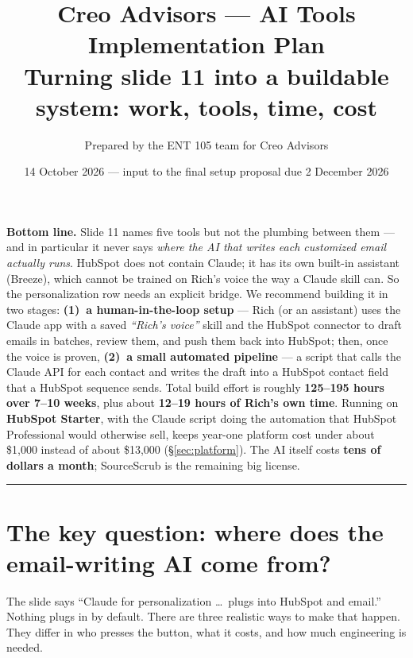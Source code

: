 \documentclass[11pt]{article}
\title{\textbf{\color{creonavy} Creo Advisors --- AI Tools Implementation Plan}\\[3pt]
\large Turning slide 11 into a buildable system: work, tools, time, cost}
\author{\normalsize Prepared by the ENT 105 team for Creo Advisors}
\date{\normalsize 14 October 2026 --- input to the final setup proposal due 2 December 2026}
\begin{document}
\maketitle
\vspace{-1.2em}

\begin{bigidea}
\textbf{Bottom line.} Slide 11 names five tools but not the plumbing between them --- and in
particular it never says \emph{where the AI that writes each customized email actually runs}.
HubSpot does not contain Claude; it has its own built-in assistant (Breeze), which cannot be
trained on Rich's voice the way a Claude skill can. So the personalization row needs an
explicit bridge. We recommend building it in two stages: \textbf{(1)~a human-in-the-loop
setup} --- Rich (or an assistant) uses the Claude app with a saved \emph{``Rich's voice''}
skill and the HubSpot connector to draft emails in batches, review them, and push them back
into HubSpot; then, once the voice is proven, \textbf{(2)~a small automated pipeline} --- a
script that calls the Claude API for each contact and writes the draft into a HubSpot contact
field that a HubSpot sequence sends. Total build effort is roughly \textbf{125--195 hours over
7--10 weeks}, plus about \textbf{12--19 hours of Rich's own time}. Running on \textbf{HubSpot Starter},
with the Claude script doing the automation that HubSpot Professional would otherwise sell, keeps
year-one platform cost under about \$1{,}000 instead of about \$13{,}000 (\S\ref{sec:platform}).
The AI itself costs \textbf{tens of dollars a month}; SourceScrub is the remaining big license.
\end{bigidea}

\tableofcontents
\vspace{0.5em}\hrule\vspace{0.7em}

\section{The key question: where does the email-writing AI come from?}
The slide says ``Claude for personalization \ldots\ plugs into HubSpot and email.'' Nothing
plugs in by default. There are three realistic ways to make that happen. They differ in who
presses the button, what it costs, and how much engineering is needed.
\end{document}

